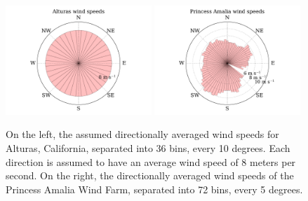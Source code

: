 \begin{figure}[htbp]
  \centering
  \includegraphics[width=0.49\textwidth]{Figures/alturas_speeds.pdf}
  \includegraphics[width=0.49\textwidth]{Figures/amalia_speeds.pdf}
  \caption{\label{wind_speeds} On the left, the assumed directionally averaged wind speeds for Alturas, California, separated into 36 bins, every 10 degrees. Each direction is assumed to have an average wind speed of 8 meters per second. On the right, the directionally averaged wind speeds of the Princess Amalia Wind Farm, separated into 72 bins, every 5 degrees.}
\end{figure}


